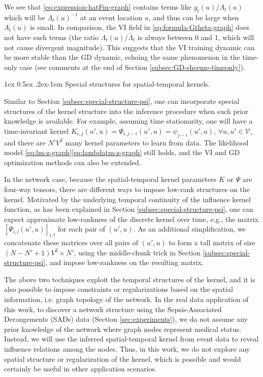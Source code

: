 \documentclass[11pt]{article}
\makeatletter
\theoremstyle{remark}
\theoremstyle{plain}
\newcommand{\calV}{\mathcal{V}}
\renewcommand{\paragraph}{%
  \@startsection{paragraph}{4}%
  {\z@}{1ex \@plus 0.5ex \@minus .2ex}{-1em}%
  {\normalfont\normalsize\itshape}%
}
\makeatother
\begin{document}
We see that \eqref{eq:expression-hatFm-graph} contains terms like 
${y_t(u)}/{ \Lambda_t(u)}$ which will be ${ \Lambda_t(u)}^{-1}$ at an event location $u$, 
and thus can be large when ${ \Lambda_t(u)}$ is small. 
In comparison, the VI field in \eqref{eq:formula-Gtheta-graph} does not have such terms
(the ratio $\Lambda_t(u)/\bar \Lambda_t$ is always between 0 and 1, which will not cause divergent magnitude).
This suggests that the VI training dynamic can be more stable than the GD dynamic, echoing the same phenomenon in the time-only case (see comments at the end of Section \ref{subsec:GD-shceme-timeonly}).




\paragraph{Special structures for spatial-temporal kernels.}

Similar to Section \ref{subsec:special-structure-psi}, one can incorporate special structures of the kernel structure into the inference procedure when such prior knowledge is available. For example, assuming time stationarity, one will have a time-invariant kernel 
$K_{i,j}(u',u) = \Psi_{i, j-i}(u', u) = \psi_{j-i}(u', u)$, $\forall u, u' \in \calV$,
and there are $N' V^2$ many kernel parameters to learn from data.
 The likelihood model \eqref{eq:lm-z-graph}\eqref{eq:lambdatm-z-graph} still holds, and the VI and GD optimization methods can also be extended. 
 
In the network case, because the spatial-temporal kernel parameters $K$ or $\Psi$ are four-way tensors, there are different ways to impose low-rank structures on the kernel. 
Motivated by the underlying temporal continuity of the influence kernel function, as has been explained in Section \ref{subsec:special-structure-psi}, one can expect approximate low-rankness of the discrete kernel over time, e.g., the matrix $[ \Psi_{i,l}(u',u) ]_{i,l}$ for each pair of $(u', u)$.
As an additional simplification, we concatenate these matrices over all pairs of $(u', u)$ to form a tall matrix of size $(N-N'+1)V^2 \times N'$, using the middle-chunk trick in Section \ref{subsec:special-structure-psi}, and impose low-rankness on the resulting matrix. 

The above two techniques exploit the temporal structures of the kernel, and it is also possible to impose constraints or regularizations based on the spatial information, i.e. graph topology of the network. 
In the real data application of this work, to discover a network structure using the Sepsis-Associated Derangements (SADs) data (Section \ref{sec:experiments}), we do not assume any prior knowledge of the network where graph nodes represent medical status. Instead, we will use the inferred spatial-temporal kernel from event data to reveal influence relations among the nodes. 
Thus, in this work, we do not explore any spatial structure or regularization of the kernel, which is possible and would certainly be useful in other application scenarios. 
\end{document}
